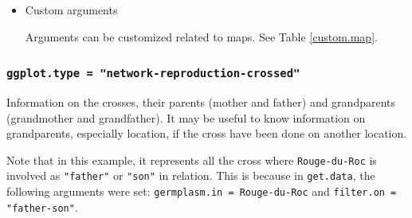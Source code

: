 \documentclass{article}\usepackage[]{graphicx}\usepackage[]{color}
\newenvironment{knitrout}{}{} %
\begin{document}
\begin{itemize}
\begin{center}
\begin{tabular}{cc}
\begin{knitrout}
{}



\end{knitrout}
\\
\end{tabular}
\end{center}


\item Custom arguments

Arguments can be customized related to maps. See Table \ref{custom.map}.

\end{itemize}


\subsubsection{\texttt{ggplot.type = "network-reproduction-crossed"}}

Information on the crosses, their parents (mother and father) and grandparents (grandmother and grandfather).
It may be useful to know information on grandparents, especially location, if the cross have been done on another location.

Note that in this example, it represents all the cross where \texttt{Rouge-du-Roc} is involved as \texttt{"father"} or \texttt{"son"} in relation.
This is because in \texttt{get.data}, the following arguments were set: \texttt{germplasm.in = Rouge-du-Roc} and \texttt{filter.on = "father-son"}.
\end{document}
